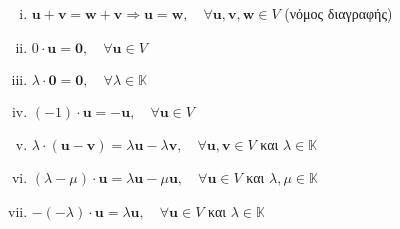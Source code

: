 \begin{thm}
\item {}
  \begin{enumerate}[i)]
    \item $ \mathbf{u} + \mathbf{v} = \mathbf{w} + \mathbf{v} 
      \Rightarrow \mathbf{u} = \mathbf{w}, \quad \forall \mathbf{u}, 
      \mathbf{v}, \mathbf{w} \in V $ \quad (νόμος διαγραφής)
    \item $ 0 \cdot \mathbf{u} = \mathbf{0}, \quad \forall \mathbf{u} \in V $
    \item $ \lambda \cdot \mathbf{0} = \mathbf{0}, \quad \forall \lambda \in 
      \mathbb{K} $
    \item $ (-1)\cdot \mathbf{u} = - \mathbf{u}, \quad \forall \mathbf{u} \in V $ 
    \item $ \lambda \cdot (\mathbf{u} - \mathbf{v}) = 
      \lambda \mathbf{u} - \lambda \mathbf{v}, \quad \forall \mathbf{u}, 
      \mathbf{v} \in V $ και $ \lambda \in \mathbb{K} $
    \item $ (\lambda - \mu ) \cdot \mathbf{u} = \lambda \mathbf{u} - 
      \mu \mathbf{u}, \quad \forall \mathbf{u} \in V $ και $ \lambda, 
      \mu \in \mathbb{K} $
    \item $ -(- \lambda ) \cdot \mathbf{u} = \lambda \mathbf{u}, 
      \quad \forall \mathbf{u} \in V $ και $ \lambda \in \mathbb{K} $
  \end{enumerate}
\end{thm}

